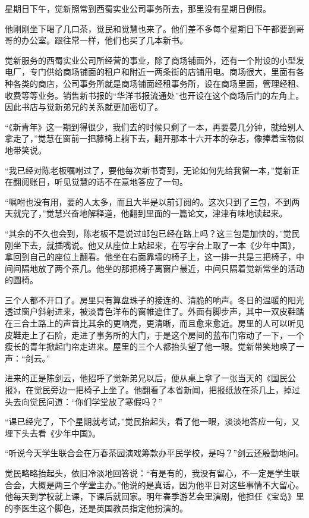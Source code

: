 \par 星期日下午，觉新照常到西蜀实业公司事务所去，那里没有星期日例假。
\par 他刚刚坐下喝了几口茶，觉民和觉慧也来了。他们差不多每个星期日下午都要到哥哥的办公室。跟往常一样，他们也买了几本新书。
\par 觉新服务的西蜀实业公司所经营的事业，除了商场铺面外，还有一个附设的小型发电厂，专门供给商场铺面的租户和附近一两条街的店铺用电。商场很大，里面有各种各类的商店，公司事务所就是商场铺面经租事务所，设在商场里面，管理经租、收费等等业务。销售新书报的“华洋书报流通处”也开设在这个商场后门的左角上。因此书店与觉新弟兄的关系就更加密切了。
\par “《新青年》这一期到得很少，我们去的时候只剩了一本，再要晏几分钟，就给别人拿走了，”觉慧在窗前一把藤椅上躺下去，翻开那本十六开本的杂志，像捧着宝物似地带笑说。
\par “我已经对陈老板嘱咐过了，要他每次新书寄到，无论如何先给我留一本，”觉新正在翻阅账目，听见觉慧的话不在意地答应了一句。
\par “嘱咐也没有用，要的人太多，而且大半是以前订阅的。这次只到了三包，不到两天就完了，”觉慧兴奋地解释道，他翻到里面的一篇论文，津津有味地读起来。
\par “其余的不久也会到，陈老板不是说过邮包已经在路上吗？这三包是加快的，”觉民刚坐下去，就插嘴说。他又从座位上站起来，在写字台上取了一本《少年中国》，拿回到自己的座位上翻看。他坐在右面靠墙的椅子上，这一排一共是三把椅子，中间间隔地放了两个茶几。他坐的那把椅子离窗户最近，中间只隔着觉新常坐的活动的圆椅。
\par 三个人都不开口了。房里只有算盘珠子的接连的、清脆的响声。冬日的温暖的阳光透过窗户斜射进来，被淡青色洋布的窗帷遮住了。外面有脚步声，其中一双皮鞋踏在三合土路上的声音比其余的更响亮，更清晰，而且愈来愈近。房里的人可以听见皮鞋走上了石阶，走进了事务所的大门，于是这个房间的蓝布门帘动了一下，一个瘦长的青年掀起门帘走进来。屋里的三个人都抬头望了他一眼。觉新带笑地唤了一声：“剑云。”
\par 进来的正是陈剑云，他招呼了觉新弟兄以后，便从桌上拿了一张当天的《国民公报》，在觉民旁边一把椅子上坐了。他翻看了本省新闻，把报纸放在茶几上，掉过头去向觉民问道：“你们学堂放了寒假吗？”
\par “课已经完了，下个星期就考试，”觉民抬起头，看了他一眼，淡淡地答应一句，又埋下头去看《少年中国》。
\par “听说今天学生联合会在万春茶园演戏筹款办平民学校，是吗？”剑云还殷勤地问。
\par 觉民略略抬起头，依旧冷淡地回答说：“有是有的，我没有留心，不一定是学生联合会，大概是两三个学堂主办。”他说的是真话，因为他平日对这些事情不大留心。他每天到学校就上课，下课后就回家。明年春季游艺会里演剧，他担任《宝岛》里的李医生这个脚色，还是英国教员指定他扮演的。
